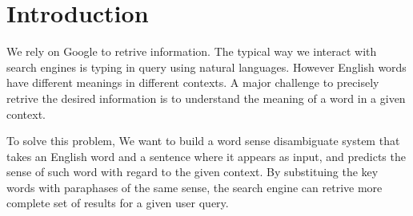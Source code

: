 \section{Introduction}

We rely on Google to retrive information. The typical way we interact with
search engines is typing in query using natural languages. However English
words have different meanings in different contexts. A major challenge to
precisely retrive the desired information is to understand the meaning
of a word in a given context.

To solve this problem, We want to build a word sense disambiguate system that
takes an English word and a sentence where it appears as input, and predicts the
sense of such word with regard to the given context. By substituing the key
words with paraphases of the same sense, the search engine can retrive more
complete set of results for a given user query.
